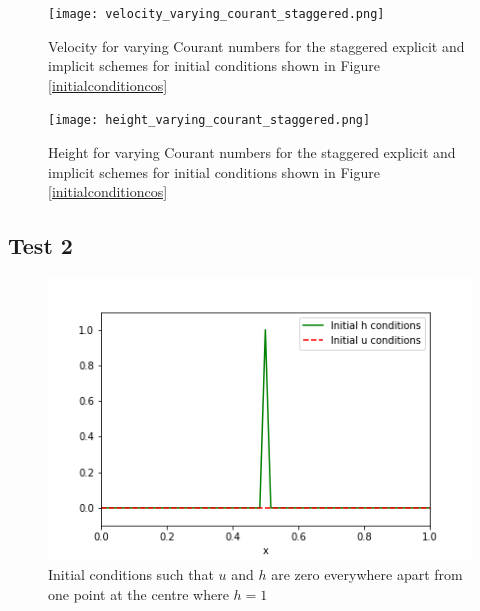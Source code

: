 \documentclass[a4paper, 10.8pt, notitlepage]{article}
\begin{document}
\begin{figure}[H]
	\begin{minipage}{.5\textwidth}
		\ContinuedFloat*
		\captionsetup{width=0.9\textwidth}
		\captionsetup{justification=centering}
		\texttt{[image: velocity\_varying\_courant\_staggered.png]}
		\caption{\label{velocity_varying_courant_staggered} Velocity for varying Courant numbers for the staggered explicit and implicit schemes for initial conditions shown in Figure \ref{initialconditioncos}}
	\end{minipage}
	\begin{minipage}{.5\textwidth}
		\ContinuedFloat
		\captionsetup{width=0.9\textwidth}
		\captionsetup{justification=centering}
		\texttt{[image: height\_varying\_courant\_staggered.png]}
		\caption{\label{height_varying_courant_staggered} Height for varying Courant numbers for the staggered explicit and implicit schemes for initial conditions shown in Figure \ref{initialconditioncos}} 
	\end{minipage}
\end{figure}

\subsection{Test 2}
\begin{figure}[H]
\begin{center}
\begin{minipage}{.5\textwidth}
	\centering
	\captionsetup{width=2\textwidth}
	\captionsetup{justification=centering}
	\includegraphics[width=\textwidth]{initial_condition_spike.png}
	\caption{\label{initialconditionspike}Initial conditions such that $u$ and $h$ are zero everywhere apart from one point at the centre where $h = 1$} 
\end{minipage}
\end{center}
\end{figure}
\end{document}
